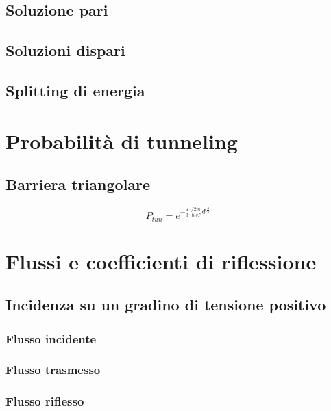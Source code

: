 \documentclass[10pt,a4paper]{report}
\begin{document}
	\section{Soluzione pari}

	\section{Soluzioni dispari}

	\section{Splitting di energia}


\chapter{Probabilità di tunneling}

	\section{Barriera triangolare}

	\begin{equation}
	P_{tun}=e^{-\frac{4}{3} \frac { \sqrt{2m} } {\hslash q F} \Phi^ { \frac {3} {2} } }
	\end{equation}
	
\chapter{Flussi e coefficienti di riflessione}

	\section{Incidenza su un gradino di tensione positivo}

		\subsection{Flusso incidente}

		\subsection{Flusso trasmesso}

		\subsection{Flusso riflesso}
\end{document}
